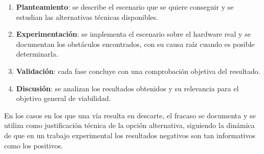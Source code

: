 \begin{enumerate}
    \item \textbf{Planteamiento}: se describe el escenario que se quiere conseguir y se estudian las 
    alternativas técnicas disponibles.

    \item \textbf{Experimentación}: se implementa el escenario sobre el hardware real y se documentan los obstáculos encontrados, con su causa raíz cuando es posible determinarla.

    \item \textbf{Validación}: cada fase concluye con una comprobación objetiva del resultado.

    \item \textbf{Discusión}: se analizan los resultados obtenidos y su relevancia para el objetivo general de viabilidad.
\end{enumerate}

En los casos en los que una vía resulta en descarte, 
el fracaso se documenta y se utiliza como justificación técnica de la opción alternativa, siguiendo la dinámica de que en un 
trabajo experimental los resultados negativos son tan informativos como los positivos.


